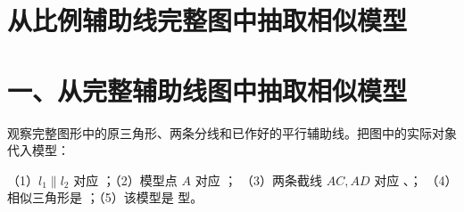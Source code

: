 \documentclass{exam-zh}
\newcounter{solstep}
\begin{document}
\section*{从比例辅助线完整图中抽取相似模型}

\section*{一、从完整辅助线图中抽取相似模型}


\begin{problem}[points=10]
  \noindent
  \begin{minipage}[t]{\dimexpr\linewidth-60mm-6mm\relax}
    \vspace{0pt}
    观察完整图形中的原三角形、两条分线和已作好的平行辅助线。把图中的实际对象代入模型：

（1）$l_1\parallel l_2$ 对应 \underline{\hspace{2cm}}；（2）模型点 $A$ 对应 \underline{\hspace{1cm}}；
（3）两条截线 $AC,AD$ 对应 \underline{\hspace{1.5cm}}、\underline{\hspace{1.5cm}}；
（4）相似三角形是 \underline{\hspace{4cm}}；（5）该模型是 \underline{\hspace{1.5cm}} 型。


  \end{minipage}\hfill
  \begin{diagramcoltikz}{60mm}{第 1 题图}
  }
  \end{diagramcoltikz}
  \par\medskip
  \answerarea[32mm]
  \setcounter{solstep}{0}
  \begin{solutionblock}
  \end{solutionblock}
\end{problem}


\end{document}
